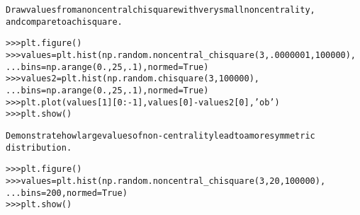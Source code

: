\begin{boxedminipage}{\funcwidth}
\begin{alltt}
Draw values from a noncentral chisquare with very small noncentrality,
and compare to a chisquare.

{\textgreater}{\textgreater}{\textgreater} plt.figure()
{\textgreater}{\textgreater}{\textgreater} values = plt.hist(np.random.noncentral\_chisquare(3, .0000001, 100000),
...                   bins=np.arange(0., 25, .1), normed=True)
{\textgreater}{\textgreater}{\textgreater} values2 = plt.hist(np.random.chisquare(3, 100000),
...                    bins=np.arange(0., 25, .1), normed=True)
{\textgreater}{\textgreater}{\textgreater} plt.plot(values[1][0:-1], values[0]-values2[0], 'ob')
{\textgreater}{\textgreater}{\textgreater} plt.show()

Demonstrate how large values of non-centrality lead to a more symmetric
distribution.

{\textgreater}{\textgreater}{\textgreater} plt.figure()
{\textgreater}{\textgreater}{\textgreater} values = plt.hist(np.random.noncentral\_chisquare(3, 20, 100000),
...                   bins=200, normed=True)
{\textgreater}{\textgreater}{\textgreater} plt.show()
\end{alltt}

\setlength{\parskip}{1ex}
    \end{boxedminipage}

    \label{QSTK:qstklearn:mldiagnostics:noncentral_f}

    \vspace{0.5ex}

